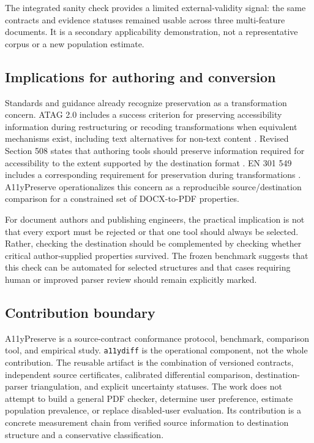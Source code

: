 The integrated sanity check provides a limited external-validity signal: the same contracts and evidence statuses remained usable across three multi-feature documents. It is a secondary applicability demonstration, not a representative corpus or a new population estimate.

\subsection{Implications for authoring and conversion}

Standards and guidance already recognize preservation as a transformation concern. ATAG 2.0 includes a success criterion for preserving accessibility information during restructuring or recoding transformations when equivalent mechanisms exist, including text alternatives for non-text content \cite{atag20}. Revised Section 508 states that authoring tools should preserve information required for accessibility to the extent supported by the destination format \cite{section508}. EN 301 549 includes a corresponding requirement for preservation during transformations \cite{etsi301549}. A11yPreserve operationalizes this concern as a reproducible source/destination comparison for a constrained set of DOCX-to-PDF properties.

For document authors and publishing engineers, the practical implication is not that every export must be rejected or that one tool should always be selected. Rather, checking the destination should be complemented by checking whether critical author-supplied properties survived. The frozen benchmark suggests that this check can be automated for selected structures and that cases requiring human or improved parser review should remain explicitly marked.

\subsection{Contribution boundary}

A11yPreserve is a source-contract conformance protocol, benchmark, comparison tool, and empirical study. \texttt{a11ydiff} is the operational component, not the whole contribution. The reusable artifact is the combination of versioned contracts, independent source certificates, calibrated differential comparison, destination-parser triangulation, and explicit uncertainty statuses. The work does not attempt to build a general PDF checker, determine user preference, estimate population prevalence, or replace disabled-user evaluation. Its contribution is a concrete measurement chain from verified source information to destination structure and a conservative classification.


